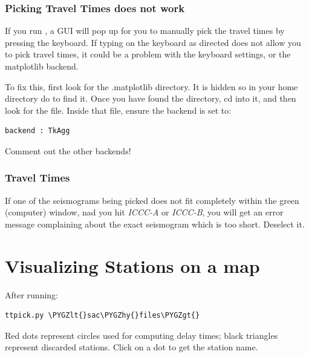 \documentclass[letterpaper,10pt,english]{sphinxmanual}
\def\PYGZlt{\char`\<}
\def\PYGZgt{\char`\>}
\def\PYGZhy{\char`\-}
\begin{document}
\subsection{Picking Travel Times does not work}
\label{docfiles/PickingTravelTimes:picking-travel-times-does-not-work}
If you run , a GUI will pop up for you to manually pick the travel times by pressing the keyboard. If typing on the keyboard as directed does not allow you to pick travel times, it could be a problem with the keyboard settings, or the matplotlib backend.

To fix this, first look for the .matplotlib directory. It is hidden so in your home directory do  to find it.
Once you have found the  directory, cd into it, and then look for the  file.
Inside that file, ensure the backend is set to:

\begin{Verbatim}[commandchars=\\\{\}]
backend : TkAgg
\end{Verbatim}

Comment out the other backends!


\subsection{Travel Times}
\label{docfiles/PickingTravelTimes:travel-times}
If one of the seismograms being picked does not fit completely within the green (computer) window, nad you hit \emph{ICCC-A} or \emph{ICCC-B}, you will get an error message complaining about the exact seismogram which is too short. Deselect it.


\chapter{Visualizing Stations on a map}
\label{docfiles/VisualizingStations:visualizing-stations-on-a-map}\label{docfiles/VisualizingStations::doc}
After running:

\begin{Verbatim}[commandchars=\\\{\}]
ttpick.py \PYGZlt{}sac\PYGZhy{}files\PYGZgt{}
\end{Verbatim}

Red dots represent circles used for computing delay times; black triangles represent discarded stations. Click on a dot to get the station name.
\end{document}
